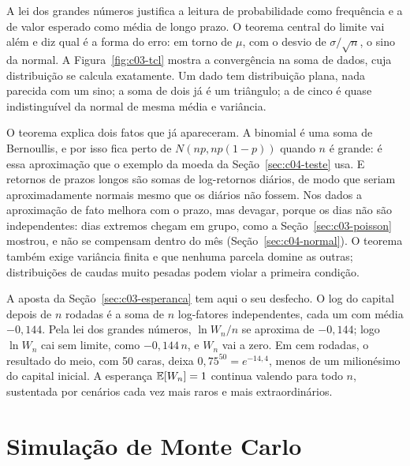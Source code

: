 A lei dos grandes números justifica a leitura de probabilidade como frequência e a de valor esperado como média de longo prazo. O teorema central do limite vai além e diz qual é a forma do erro: em torno de $\mu$, com o desvio de $\sigma/\sqrt{n}$, o sino da normal. A Figura~\ref{fig:c03-tcl} mostra a convergência na soma de dados, cuja distribuição se calcula exatamente. Um dado tem distribuição plana, nada parecida com um sino; a soma de dois já é um triângulo; a de cinco é quase indistinguível da normal de mesma média e variância.


O teorema explica dois fatos que já apareceram. A binomial é uma soma de Bernoullis, e por isso fica perto de $N(np, np(1-p))$ quando $n$ é grande: é essa aproximação que o exemplo da moeda da Seção~\ref{sec:c04-teste} usa. E retornos de prazos longos são somas de log-retornos diários, de modo que seriam aproximadamente normais mesmo que os diários não fossem. Nos dados a aproximação de fato melhora com o prazo, mas devagar, porque os dias não são independentes: dias extremos chegam em grupo, como a Seção~\ref{sec:c03-poisson} mostrou, e não se compensam dentro do mês (Seção~\ref{sec:c04-normal}). O teorema também exige variância finita e que nenhuma parcela domine as outras; distribuições de caudas muito pesadas podem violar a primeira condição.

A aposta da Seção~\ref{sec:c03-esperanca} tem aqui o seu desfecho. O log do capital depois de $n$ rodadas é a soma de $n$ log-fatores independentes, cada um com média $-0,144$. Pela lei dos grandes números, $\ln W_n / n$ se aproxima de $-0,144$; logo $\ln W_n$ cai sem limite, como $-0,144\,n$, e $W_n$ vai a zero. Em cem rodadas, o resultado do meio, com 50 caras, deixa $0,75^{50} = e^{-14,4}$, menos de um milionésimo do capital inicial. A esperança $\operatorname{\mathbb{E}}[W_n] = 1$ continua valendo para todo $n$, sustentada por cenários cada vez mais raros e mais extraordinários.

\section{Simulação de Monte Carlo}
\label{sec:c03-montecarlo}

